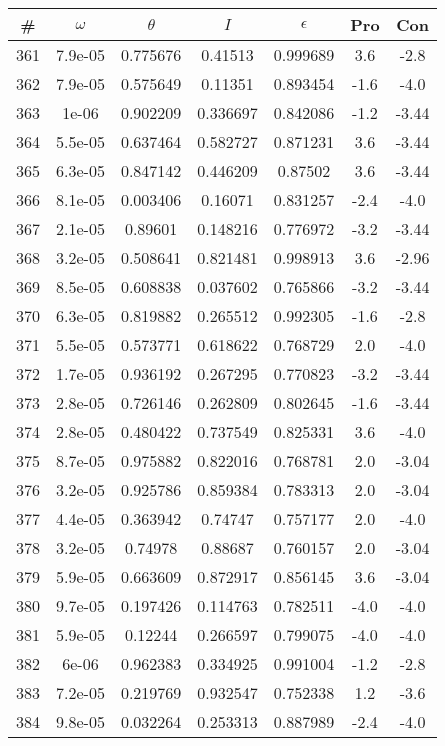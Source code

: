 \begin{table}
\begin{tabular}{c|c|c|c|c|c|c}
\# & $\omega$ & $\theta$ & $I$ & $\epsilon$ & Pro & Con\\
\hline
361 & 7.9e-05 & 0.775676 & 0.41513 & 0.999689 & 3.6 & -2.8\\
362 & 7.9e-05 & 0.575649 & 0.11351 & 0.893454 & -1.6 & -4.0\\
363 & 1e-06 & 0.902209 & 0.336697 & 0.842086 & -1.2 & -3.44\\
364 & 5.5e-05 & 0.637464 & 0.582727 & 0.871231 & 3.6 & -3.44\\
365 & 6.3e-05 & 0.847142 & 0.446209 & 0.87502 & 3.6 & -3.44\\
366 & 8.1e-05 & 0.003406 & 0.16071 & 0.831257 & -2.4 & -4.0\\
367 & 2.1e-05 & 0.89601 & 0.148216 & 0.776972 & -3.2 & -3.44\\
368 & 3.2e-05 & 0.508641 & 0.821481 & 0.998913 & 3.6 & -2.96\\
369 & 8.5e-05 & 0.608838 & 0.037602 & 0.765866 & -3.2 & -3.44\\
370 & 6.3e-05 & 0.819882 & 0.265512 & 0.992305 & -1.6 & -2.8\\
371 & 5.5e-05 & 0.573771 & 0.618622 & 0.768729 & 2.0 & -4.0\\
372 & 1.7e-05 & 0.936192 & 0.267295 & 0.770823 & -3.2 & -3.44\\
373 & 2.8e-05 & 0.726146 & 0.262809 & 0.802645 & -1.6 & -3.44\\
374 & 2.8e-05 & 0.480422 & 0.737549 & 0.825331 & 3.6 & -4.0\\
375 & 8.7e-05 & 0.975882 & 0.822016 & 0.768781 & 2.0 & -3.04\\
376 & 3.2e-05 & 0.925786 & 0.859384 & 0.783313 & 2.0 & -3.04\\
377 & 4.4e-05 & 0.363942 & 0.74747 & 0.757177 & 2.0 & -4.0\\
378 & 3.2e-05 & 0.74978 & 0.88687 & 0.760157 & 2.0 & -3.04\\
379 & 5.9e-05 & 0.663609 & 0.872917 & 0.856145 & 3.6 & -3.04\\
380 & 9.7e-05 & 0.197426 & 0.114763 & 0.782511 & -4.0 & -4.0\\
381 & 5.9e-05 & 0.12244 & 0.266597 & 0.799075 & -4.0 & -4.0\\
382 & 6e-06 & 0.962383 & 0.334925 & 0.991004 & -1.2 & -2.8\\
383 & 7.2e-05 & 0.219769 & 0.932547 & 0.752338 & 1.2 & -3.6\\
384 & 9.8e-05 & 0.032264 & 0.253313 & 0.887989 & -2.4 & -4.0\\

\end{tabular}
\end{table}
